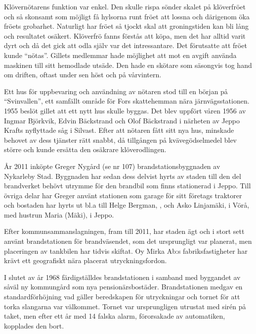 Klövernötarens funktion var enkel. Den skulle rispa sönder skalet på klöverfröet och så skonsamt som möjligt få hylsorna runt fröet att lossna och därigenom öka fröets grobarhet. Naturligt har fröet så tjockt skal att groningstiden kan bli lång och resultatet osäkert. Klöverfrö fanns förstås att köpa, men det har alltid varit dyrt och då det gick att odla själv var det intressantare. Det förutsatte att fröet kunde ``nötas''. Gillets medlemmar hade möjlighet att mot en avgift använda maskinen till sitt hemodlade utsäde. Den hade en skötare som säsongvis tog hand om driften, oftast under sen höst och på vårvintern.

Ett hus för uppbevaring och användning av nötaren stod till en början på ``Svinvallen'', ett samfällt område för Fors skattehemman nära järnvägsstationen. 1955 beslöt gillet att ett nytt hus skulle byggas. Det blev uppfört våren 1956 av Ingmar Björkvik, Edvin  Bäckstrand och Olof Bäckstrand i närheten av Jeppo Krafts nyflyttade såg i Silvast. Efter att nötaren fått sitt nya hus, minskade behovet av dess tjänster rätt snabbt, då tillgången på kvävegödselmedel blev större och kunde ersätta den osäkrare klöverodlingen.



%



%
År 2011 inköpte Greger Nygård (se nr 107) brandstationsbyggnaden av Nykarleby Stad. Byggnaden har sedan dess delvist hyrts av staden till den del brandverket behövt utrymme för den brandbil som finns stationerad i Jeppo. Till övriga delar har Greger använt stationen som garage för sitt företags traktorer och bostaden har hyrts ut bl.a till Helge Bergman, , och Asko Linjamäki,  i Vörå, med hustrun Maria (Mäki),  i Jeppo.


%
Efter kommunsammanslagningen, fram till 2011, har staden ägt och i stort sett använt brandstationen för brandväsendet, som det ursprungligt var planerat, men placeringen av tankbilen har tidvis skiftat. Oy Mirka Ab:s fabriksfastigheter har krävt ett geografiskt nära placerat utryckningsfordon.


%
I slutet av år 1968 färdigställdes brandstationen i samband med byggandet av såväl ny kommungård som nya pensionärsbostäder. Brandstationen medgav en standardförhöjning vad gäller beredskapen för utryckningar och tornet för att torka slangarna var välkommet. Tornet var ursprungligen utrustat med sirén på taket, men efter ett år med 14 falska alarm, förorsakade av automatiken, kopplades den bort.


